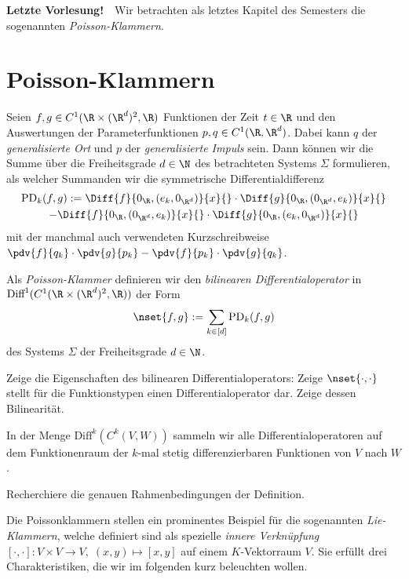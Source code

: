 \documentclass[../WiSe22ANA3.tex]{subfiles}
\begin{document}
		\textbf{Letzte Vorlesung! 🥳}
		Wir betrachten als letztes Kapitel des Semesters die sogenannten \emph{Poisson-Klammern}.
		\section{Poisson-Klammern}
			Seien $f,g\in C^1(\R\times(\R^d)^2,\R)$ Funktionen der Zeit $t\in\R$ und den Auswertungen der Parameterfunktionen $p,q\in C^1(\R,\R^d)$. Dabei kann $q$ der \emph{generalisierte Ort} und $p$ der \emph{generalisierte Impuls} sein. Dann können wir die Summe über die Freiheitsgrade $d\in\N$ des betrachteten Systems $\Sigma$ formulieren, als welcher Summanden wir die  symmetrische Differentialdifferenz
			\begin{multline*}
				\text{PD}_k(f,g):=\Diff{f}{0_\R,(e_k,0_{\R^d})}{x}{}\cdot\Diff{g}{0_\R,(0_{\R^d},e_k)}{x}{}\\
				-\Diff{f}{0_\R,(0_{\R^d},e_k)}{x}{}\cdot\Diff{g}{0_\R,(e_k,0_{\R^d})}{x}{}
			\end{multline*}
			mit der manchmal auch verwendeten Kurzschreibweise $\pdv{f}{q_k}\cdot\pdv{g}{p_k}-\pdv{f}{p_k}\cdot\pdv{g}{q_k}$. 
			\begin{info}
				Als \emph{Poisson-Klammer} definieren wir den \emph{bilinearen Differentialoperator} in $\text{Diff}^1(C^1(\R\times(\R^d)^2,\R))$ der Form 
				$$\nset{f,g}:=\sum_{k\in[d]}\text{PD}_k(f,g)$$
				des Systems $\Sigma$ der Freiheitsgrade $d\in\N$. 
			\end{info}
			\begin{Aufgabe}
				\nr Zeige die Eigenschaften des bilinearen Differentialoperators: Zeige $\nset{\cdot,\cdot}$ stellt für die Funktionstypen einen Differentialoperator dar. Zeige dessen Bilinearität. 
			\end{Aufgabe}
			In der Menge $\text{Diff}^k(C^k(V,W))$ sammeln wir alle Differentialoperatoren auf dem Funktionenraum der $k$-mal stetig differenzierbaren Funktionen von $V$ nach $W$. 
			\begin{Aufgabe}
				\nr Recherchiere die genauen Rahmenbedingungen der Definition. 
			\end{Aufgabe}
			Die Poissonklammern stellen ein prominentes Beispiel für die sogenannten \emph{Lie-Klammern}, welche definiert sind als spezielle \emph{innere Verknüpfung} $[\cdot,\cdot]:V\times V\to V,\;(x,y)\mapsto [x,y]$ auf einem $K$-Vektorraum $V$. Sie erfüllt drei Charakteristiken, die wir im folgenden kurz beleuchten wollen. 
\end{document}
